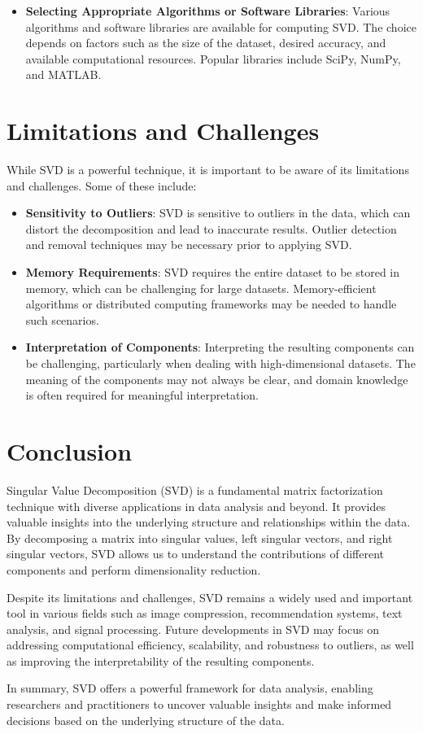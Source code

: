 \documentclass[a4paper]{article}
\begin{document}
{\begin{itemize}
			\item \textbf{Selecting Appropriate Algorithms or Software Libraries}: Various algorithms and software libraries are available for computing SVD. The choice depends on factors such as the size of the dataset, desired accuracy, and available computational resources. Popular libraries include SciPy, NumPy, and MATLAB.
		\end{itemize}
		
		\section{Limitations and Challenges}
		While SVD is a powerful technique, it is important to be aware of its limitations and challenges. Some of these include:
		
		\begin{itemize}
			\item \textbf{Sensitivity to Outliers}: SVD is sensitive to outliers in the data, which can distort the decomposition and lead to inaccurate results. Outlier detection and removal techniques may be necessary prior to applying SVD.
			
			\item \textbf{Memory Requirements}: SVD requires the entire dataset to be stored in memory, which can be challenging for large datasets. Memory-efficient algorithms or distributed computing frameworks may be needed to handle such scenarios.
			
			\item \textbf{Interpretation of Components}: Interpreting the resulting components can be challenging, particularly when dealing with high-dimensional datasets. The meaning of the components may not always be clear, and domain knowledge is often required for meaningful interpretation.
		\end{itemize}
		
		\section{Conclusion}
		Singular Value Decomposition (SVD) is a fundamental matrix factorization technique with diverse applications in data analysis and beyond. It provides valuable insights into the underlying structure and relationships within the data. By decomposing a matrix into singular values, left singular vectors, and right singular vectors, SVD allows us to understand the contributions of different components and perform dimensionality reduction.
		
		Despite its limitations and challenges, SVD remains a widely used and important tool in various fields such as image compression, recommendation systems, text analysis, and signal processing. Future developments in SVD may focus on addressing computational efficiency, scalability, and robustness to outliers, as well as improving the interpretability of the resulting components.
		
		In summary, SVD offers a powerful framework for data analysis, enabling researchers and practitioners to uncover valuable insights and make informed decisions based on the underlying structure of the data.
	}
	\newpage
	
\end{document}
